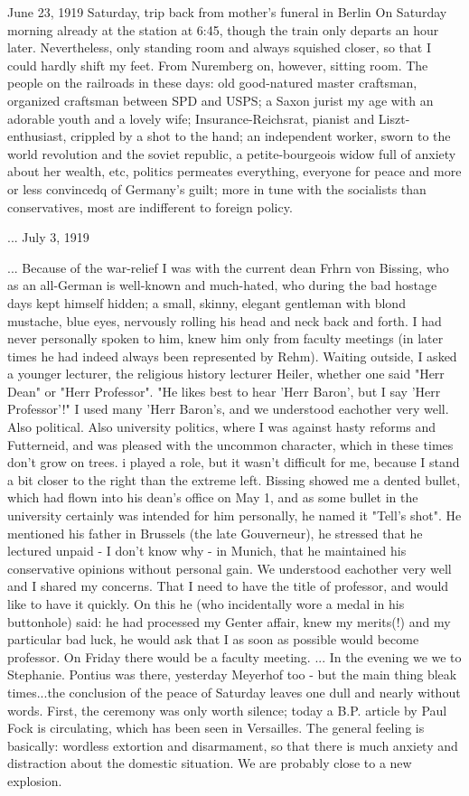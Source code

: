 June 23, 1919
{Saturday, trip back from mother's funeral in Berlin}
On Saturday morning already at the station at 6:45, though the train only departs an hour later. Nevertheless, only standing room and always squished closer, so that I could hardly shift my feet. From Nuremberg on, however, sitting room. The people on the railroads in these days: old good-natured master craftsman, organized craftsman between SPD and USPS; a Saxon jurist my age with an adorable youth and a lovely wife; Insurance-Reichsrat, pianist and Liszt-enthusiast, crippled by a shot to the hand; an independent worker, sworn to the world revolution and the soviet republic, a petite-bourgeois widow full of anxiety about her wealth, etc, politics permeates everything, everyone for peace and more or less convincedq of Germany's guilt; {more in tune with the socialists than conservatives}, most are indifferent to foreign policy.

{...}
July 3, 1919

{...}
Because of the war-relief I was with the current dean Frhrn von Bissing, who as an all-German is well-known and much-hated, who during the bad hostage days kept himself hidden; a small, skinny, elegant gentleman with blond mustache, blue eyes, nervously rolling his head and neck back and forth. I had never personally spoken to him, knew him only from faculty meetings (in later times he had indeed always been represented by Rehm). Waiting outside, I asked a younger lecturer, the religious history lecturer Heiler, whether one said "Herr Dean" or "Herr Professor". "He likes best to hear 'Herr Baron', but I say 'Herr Professor'!"
I {used many 'Herr Baron's}, and we understood eachother very well. Also political. Also university politics, where I was against hasty reforms and {Futterneid}, and was pleased with the uncommon character, which in these {times don't grow on trees}. i played a role, but it wasn't difficult for me, because I stand a bit closer to the right than the extreme left. Bissing showed me a dented bullet, which had flown into his dean's office on May 1, and as {some bullet in the university} certainly was intended for him personally, he named it "Tell's shot". He mentioned his father in Brussels (the late Gouverneur), he stressed that he lectured unpaid - I don't know why - in Munich, that he maintained his conservative opinions without personal gain. We understood eachother very well and I shared my {concerns}. That I need to have the title of professor, and would like to have it quickly. On this he (who incidentally wore a medal in his buttonhole) said: he had {processed my Genter affair}, knew my {merits}(!) and my particular bad luck, he would ask that I as soon as possible would become professor. On Friday there would be a faculty meeting. 
{...}
In the evening we we to Stephanie. Pontius was there, yesterday Meyerhof too - but the main thing bleak times...the conclusion of the peace of Saturday {leaves} one dull and nearly without words. First, the ceremony was only worth silence; today a B.P. article by Paul Fock is circulating, {which has been seen in Versailles}. The general feeling is basically: {wordless} extortion and disarmament, so that there is much anxiety and distraction about the domestic situation. We are probably close to a new explosion.

